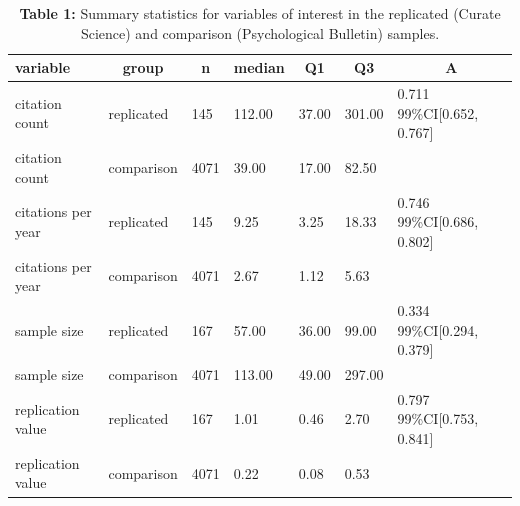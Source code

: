 \documentclass[
  english,
  man,floatsintext]{apa6}
\begin{document}
\begin{table}[tbp]

\begin{center}
\begin{threeparttable}

\caption{\label{tab:tab1}\textbf{Table 1:} Summary statistics for variables of interest in the replicated (Curate Science) and comparison (Psychological Bulletin) samples.}

\begin{tabular}{lllllll}
\toprule
variable & \multicolumn{1}{c}{group} & \multicolumn{1}{c}{n} & \multicolumn{1}{c}{median} & \multicolumn{1}{c}{Q1} & \multicolumn{1}{c}{Q3} & \multicolumn{1}{c}{A}\\
\midrule
citation count & replicated & 145 & 112.00 & 37.00 & 301.00 & 0.711 99\%CI[0.652, 0.767]\\
citation count & comparison & 4071 & 39.00 & 17.00 & 82.50 & \\
citations per year & replicated & 145 & 9.25 & 3.25 & 18.33 & 0.746 99\%CI[0.686, 0.802]\\
citations per year & comparison & 4071 & 2.67 & 1.12 & 5.63 & \\
sample size & replicated & 167 & 57.00 & 36.00 & 99.00 & 0.334 99\%CI[0.294, 0.379]\\
sample size & comparison & 4071 & 113.00 & 49.00 & 297.00 & \\
replication value & replicated & 167 & 1.01 & 0.46 & 2.70 & 0.797 99\%CI[0.753, 0.841]\\
replication value & comparison & 4071 & 0.22 & 0.08 & 0.53 & \\
\bottomrule
\end{tabular}

\end{threeparttable}
\end{center}

\end{table}
\end{document}
